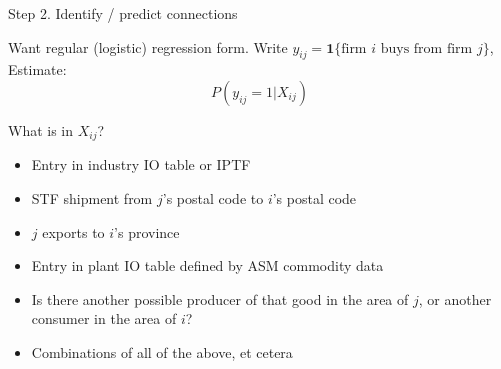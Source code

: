\documentclass[12pt]{beamer}
\begin{document}
\begin{frame}{Step 2. Identify / predict connections}

\begin{block}{Want regular (logistic) regression form.}
Write $y_{ij}=\mathbf{1} \{ \text{firm $i$ buys from firm $j$}  \} $, %
Estimate:
\[ P( y_{ij} = 1 | X_{ij}) \]
\end{block}

\begin{block}{What is in $X_{ij}$?}
\begin{itemize}
\item Entry in industry IO table or IPTF
\item STF shipment from $j$'s postal code to $i$'s postal code
\item $j$ exports to $i$'s province
\item Entry in plant IO table defined by ASM commodity data
\item Is there another possible producer of that good in the area of $j$, or another consumer in the area of $i$?
\item Combinations of all of the above, et cetera
\end{itemize}
\end{block}

%


\end{frame}
\end{document}
